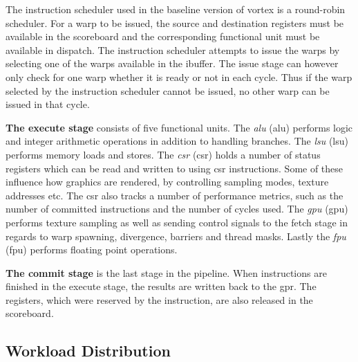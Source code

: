 The instruction scheduler used in the baseline version of \Gls{vortex} is a round-robin scheduler. For a warp to be issued, the source and destination registers must be available in the scoreboard and the corresponding functional unit must be available in dispatch. The instruction scheduler attempts to issue the warps by selecting one of the warps available in the ibuffer. The issue stage can however only check for one warp whether it is ready or not in each cycle. Thus if the warp selected by the instruction scheduler cannot be issued, no other warp can be issued in that cycle.

\vspace{1mm}\noindent
\textbf{The execute stage} consists of five functional units. The \textit{\acrlong{alu}} (\acrshort{alu}) performs logic and integer arithmetic operations in addition to handling branches. The \textit{\acrlong{lsu}} (\acrshort{lsu}) performs memory loads and stores. The \textit{\acrlong{csr}} (\acrshort{csr}) holds a number of status registers which can be read and written to using \acrshort{csr} instructions. Some of these influence how graphics are rendered, by controlling sampling modes, texture addresses etc. The \acrshort{csr} also tracks a number of performance metrics, such as the number of committed instructions and the number of cycles used. The \textit{\acrlong{gpu}} (\acrshort{gpu}) performs texture sampling as well as sending control signals to the fetch stage in regards to warp spawning, divergence, barriers and thread masks. Lastly the \textit{\acrlong{fpu}} (\acrshort{fpu}) performs floating point operations.

\vspace{1mm}\noindent
\textbf{The commit stage} is the last stage in the pipeline. When instructions are finished in the execute stage, the results are written back to the \acrfull{gpr}. The registers, which were reserved by the instruction, are also released in the scoreboard.

\subsection{Workload Distribution}

